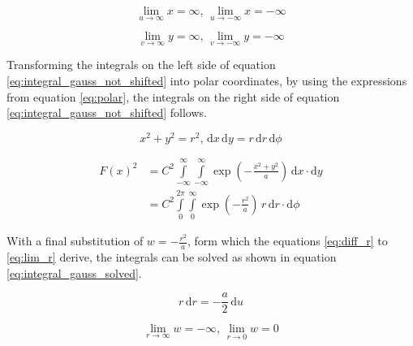 \begin{center}
	\begin{equation} \label{eq:lim_x}
		\lim\limits_{u \to \infty} x = \infty \text{, } \lim\limits_{u \to -\infty} x = -\infty
	\end{equation}
\end{center}
\begin{center}
	\begin{equation} \label{eq:lim_y}
		\lim\limits_{v \to \infty} y = \infty \text{, } \lim\limits_{v \to -\infty} y = -\infty
	\end{equation}
\end{center}
Transforming the integrals on the left side of equation \ref{eq:integral_gauss_not_shifted} into polar coordinates, by using the expressions from equation \ref{eq:polar}, the integrals on the right side of equation \ref{eq:integral_gauss_not_shifted} follows.
\begin{center}
	\begin{equation} \label{eq:polar}
		x^2 + y^2 = r^2 \text{, } \mathrm{d}x \, \mathrm{d}y = r \, \mathrm{d}r \,\mathrm{d}\phi
	\end{equation}
\end{center}
\begin{center}
	\begin{equation} \label{eq:integral_gauss_not_shifted}
		\begin{aligned}
		F\left(x\right)^2 &= C^2 \int\limits_{-\infty}^{\infty} \int\limits_{-\infty}^{\infty} \exp\left(-\frac{x^2 + y^2}{a}\right) \,\mathrm{d}x \cdot \mathrm{d}y \\
		&= C^2 \int\limits_{0}^{2\pi} \int\limits_{0}^{\infty} \exp\left(-\frac{r^2}{a}\right) \, r \,\mathrm{d}r \cdot \mathrm{d}\phi
		\end{aligned}
	\end{equation}
\end{center}
With a final substitution of $w = -\frac{r^2}{a}$, form which the equations \ref{eq:diff_r} to \ref{eq:lim_r} derive, the integrals can be solved as shown in equation \ref{eq:integral_gauss_solved}.
\begin{center}
	\begin{equation} \label{eq:diff_r}
		r\,\mathrm{d}r = -\frac{a}{2} \, \mathrm{d}u
	\end{equation}
\end{center}
\begin{center}
	\begin{equation} \label{eq:lim_r}
		\lim\limits_{r \to \infty} w = -\infty \text{, } \lim\limits_{r \to 0} w = 0
	\end{equation}
\end{center}

